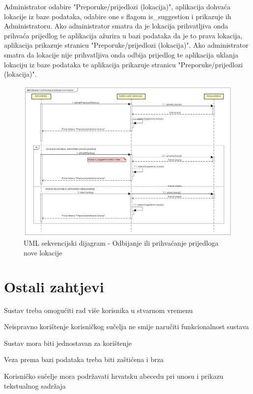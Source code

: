                 
                Administrator odabire "Preporuke/prijedlozi (lokacija)", aplikacija dohvaća lokacije iz baze podataka, odabire one s flagom is\_suggestion i prikazuje ih Administratoru. Ako administrator smatra da je lokacija prihvatljiva onda prihvaća prijedlog te aplikacija ažurira u bazi podataka da je to prava lokacija, aplikacija prikazuje stranicu "Preporuke/prijedlozi (lokacija)". Ako administrator smatra da lokacije nije prihvatljiva onda odbija prijedlog te aplikacija uklanja lokaciju iz baze podataka te aplikacija prikazuje stranicu "Preporuke/prijedlozi (lokacija)".
                \begin{figure}[H]
                	\includegraphics[scale=0.4]{slike/SD-odbijanjeprihvacanje.png} %
                	\centering
                	\caption{UML sekvencijski dijagram - Odbijanje ili prihvaćanje prijedloga nove lokacije}
                			
                \end{figure}
                
				
				\eject
	
		\section{Ostali zahtjevi}
		
		    
			\begin{packed_item}
			    \item Sustav treba omogućiti rad više korisnika u stvarnom vremenu
			    \item Neispravno korištenje korisničkog sučelja ne smije naručiti funkcionalnost sustava
			    \item Sustav mora biti jednostavan za korištenje
			    \item Veza prema bazi podataka treba biti zaštićena i brza
			    \item Korisničko sučelje mora podržavati hrvatsku abecedu pri unosu i prikazu tekstualnog sadržaja
			\end{packed_item}
			 
			 
			 
	